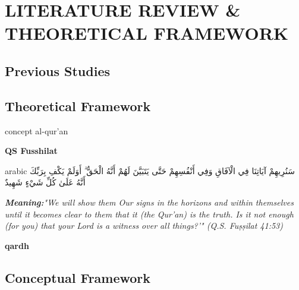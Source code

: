 \chapter{LITERATURE REVIEW \& THEORETICAL FRAMEWORK}
	\section{Previous Studies}
	
	\begin{secenumerate}
		\item \lipsum[1]
		\item \lipsum[1]
		\item \lipsum[1]
	\end{secenumerate}

	\section{Theoretical Framework}
	\begin{secenumerate}
		\item concept al-qur'an
		\begin{secenumerate}
			\item \textbf{QS Fusshilat}
			\begin{otherlanguage*}{arabic}
				\noindent
				سَنُرِيهِمْ آيَاتِنَا فِي الْآفَاقِ وَفِي أَنْفُسِهِمْ حَتَّى يَتَبَيَّنَ لَهُمْ أَنَّهُ الْحَقُّ ۗ أَوَلَمْ يَكْفِ بِرَبِّكَ أَنَّهُ عَلَىٰ كُلِّ شَيْءٍ شَهِيدٌ
			\end{otherlanguage*}
			\vspace{0.5cm}
			
			\textit{\textbf{Meaning:}"We will show them Our signs in the horizons and within themselves until it becomes clear to them that it (the Qur'an) is the truth. Is it not enough (for you) that your Lord is a witness over all things?'" (Q.S. Fuṣṣilat 41:53)}\\
			
			\lipsum[2]
		\end{secenumerate}
		\item \textbf{qardh}
		\lipsum
	\end{secenumerate}
	\section{Conceptual Framework}
